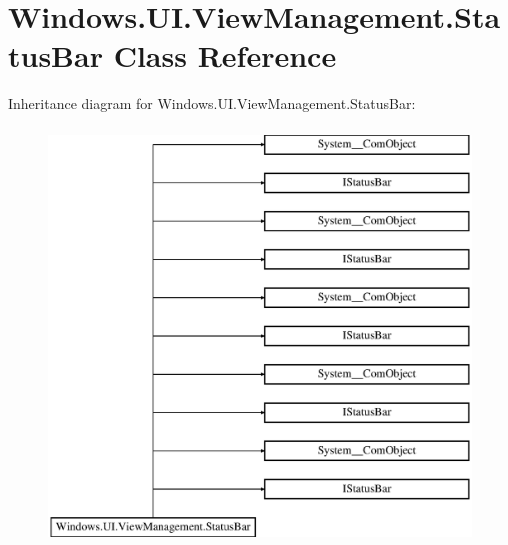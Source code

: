 \hypertarget{class_windows_1_1_u_i_1_1_view_management_1_1_status_bar}{}\section{Windows.\+U\+I.\+View\+Management.\+Status\+Bar Class Reference}
\label{class_windows_1_1_u_i_1_1_view_management_1_1_status_bar}
Inheritance diagram for Windows.\+U\+I.\+View\+Management.\+Status\+Bar\+:\begin{figure}[H]
\begin{center}
\leavevmode
\includegraphics[height=11.000000cm]{class_windows_1_1_u_i_1_1_view_management_1_1_status_bar}
\end{center}
\end{figure}
